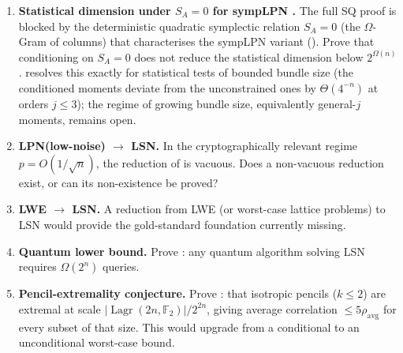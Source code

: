 \documentclass[11pt,a4paper]{article}
\theoremstyle{plain}
\theoremstyle{definition}
\newcommand{\F}{\mathbb{F}}
\DeclareMathOperator{\Lagr}{Lagr}
\begin{document}
\begin{enumerate}
\item \textbf{Statistical dimension under $S_A=0$ for sympLPN \cite{LPQR26}.} The full SQ proof is blocked by the deterministic quadratic symplectic relation $S_A=0$ (the $\Omega$-Gram of columns) that characterises the sympLPN variant (). Prove that conditioning on $S_A=0$ does not reduce the statistical dimension below $2^{\Omega(n)}$.  resolves this exactly for statistical tests of bounded bundle size (the conditioned moments deviate from the unconstrained ones by $\Theta(4^{-n})$ at orders $j \le 3$); the regime of growing bundle size, equivalently general-$j$ moments, remains open.

\item \textbf{LPN(low-noise) $\to$ LSN.} In the cryptographically relevant regime $p=O(1/\sqrt{n})$, the reduction of \cite{KLP+25} is vacuous. Does a non-vacuous reduction exist, or can its non-existence be proved?

\item \textbf{LWE $\to$ LSN.} A reduction from LWE (or worst-case lattice problems) to LSN would provide the gold-standard foundation currently missing.

\item \textbf{Quantum lower bound.} Prove : any quantum algorithm solving LSN requires $\Omega(2^n)$ queries.

\item \textbf{Pencil-extremality conjecture.} \label{open:sda} Prove : that isotropic pencils ($k \leq 2$) are extremal at scale $|\Lagr(2n,\F_2)|/2^{2n}$, giving average correlation $\leq 5\rho_{\mathrm{avg}}$ for every subset of that size. This would upgrade  from a conditional to an unconditional worst-case bound.


\end{enumerate}
\end{document}

